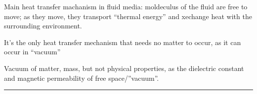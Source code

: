 \documentclass[letterpaper,10pt,english]{jupyterBook}
\begin{document}
\sphinxAtStartPar
{} Main heat transfer machanism in fluid media: moldeculus of the fluid are free to move; as they move, they transport “thermal energy” and xechange heat with the surrounding environment.

\sphinxAtStartPar
{} It’s the only heat transfer mechanism that needs no matter to occur, as it can occur in “vacuum”%
\begin{footnote}[1]\sphinxAtStartFootnote
Vacuum of matter, mass, but not physical properties, as the dielectric constant and magnetic permeability of free space/”vacuum”.
%
\end{footnote}


\bigskip\hrule\bigskip
\end{document}
